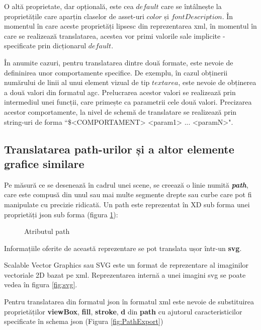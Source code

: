  O altă proprietate, dar opțională, este cea $default$ care se întâlnește la proprietățile care aparțin claselor de asset-uri $color$ și $fontDescription$. În momentul în care aceste proprietăți lipsesc din reprezentarea xml, în momentul în care se realizează translatarea, acestea vor primi valorile sale implicite - specificate prin dicționarul $default$.

 În anumite cazuri, pentru translatarea dintre două formate, este nevoie de defininirea unor comportamente specifice. De exemplu, în cazul obținerii numărului de linii al unui element vizual de tip $text area$, este nevoie de obținerea a două valori din formatul agc. Prelucrarea acestor valori se realizează prin intermediul unei funcții, care primește ca parametrii cele două valori. 
 Precizarea acestor comportamente, la nivel de schemă de translatare se realizează prin string-uri de forma ``\$<COMPORTAMENT> <param1> ... <paramN>".

\subsection{Translatarea path-urilor și a altor elemente grafice similare}

Pe măsură ce se desenează în cadrul unei scene, se creează o linie numită \textbf{\textit{path}}, care este compusă din unul sau mai multe segmente drepte sau curbe care pot fi manipulate cu precizie ridicată. Un path este reprezentat în XD sub forma unei proprietăți json sub forma (figura \ref{fig:path}):

\begin{figure}[!htbp]
\caption{Atributul path}\label{fig:path}
\end{figure}

Informațiile oferite de această reprezentare se pot translata ușor într-un \textbf{svg}. 

Scalable Vector Graphics sau SVG este un format de reprezentare al imaginilor vectoriale 2D bazat pe xml. Reprezentarea internă a unei imagini svg se poate vedea în figura \ref{fig:svg}.

Pentru translatarea din formatul json în formatul xml este nevoie de substituirea proprietăților \textbf{viewBox}, \textbf{fill}, \textbf{stroke}, \textbf{d} din \textbf{path} cu ajutorul caracteristicilor specificate în schema json (Figura \ref{fig:PathExport})


